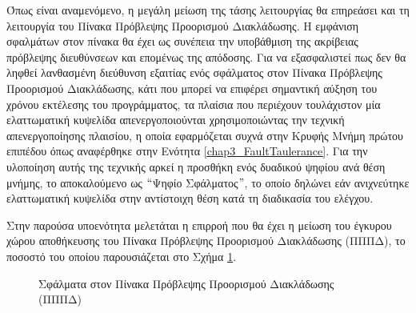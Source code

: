 Όπως είναι αναμενόμενο, η μεγάλη μείωση της τάσης λειτουργίας θα επηρεάσει και τη λειτουργία του Πίνακα Πρόβλεψης Προορισμού Διακλάδωσης. Η εμφάνιση σφαλμάτων στον πίνακα θα έχει ως συνέπεια την υποβάθμιση της ακρίβειας πρόβλεψης διευθύνσεων και επομένως της απόδοσης. Για να εξασφαλιστεί πως δεν θα ληφθεί λανθασμένη διεύθυνση εξαιτίας ενός σφάλματος στον Πίνακα Πρόβλεψης Προορισμού Διακλάδωσης, κάτι που μπορεί να επιφέρει σημαντική αύξηση του χρόνου εκτέλεσης του προγράμματος, τα πλαίσια που περιέχουν τουλάχιστον μία ελαττωματική κυψελίδα απενεργοποιούνται χρησιμοποιώντας την τεχνική απενεργοποίησης πλαισίου, η οποία εφαρμόζεται συχνά στην Κρυφής Μνήμη πρώτου επιπέδου όπως αναφέρθηκε στην Ενότητα \ref{chap3_FaultTaulerance}. Για την υλοποίηση αυτής της τεχνικής αρκεί η προσθήκη ενός δυαδικού ψηφίου ανά θέση μνήμης, το αποκαλούμενο ως $``$Ψηφίο Σφάλματος$"$, το οποίο δηλώνει εάν ανιχνεύτηκε ελαττωματική κυψελίδα στην αντίστοιχη θέση κατά τη διαδικασία του ελέγχου.
\par
Στην παρούσα υποενότητα μελετάται η επιρροή που θα έχει η μείωση του έγκυρου χώρου αποθήκευσης του Πίνακα Πρόβλεψης Προορισμού Διακλάδωσης (ΠΠΠΔ), το ποσοστό του οποίου παρουσιάζεται στο Σχήμα \ref{fig:chap4_btb_fmaps}.

\begin{figure}[!t]
    \centering
    \caption{Σφάλματα στον Πίνακα Πρόβλεψης Προορισμού Διακλάδωσης (ΠΠΠΔ)}
    \label{fig:chap4_btb_fmaps}
\end{figure}

